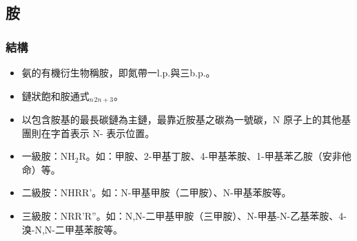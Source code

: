\documentclass[a4paper,12pt]{report}
\begin{document}
\begin{itemize}
\subsection{胺}
\subsubsection{結構}
\begin{itemize}
\item 氨的有機衍生物稱胺，即氮帶一l.p.與三b.p.。
\item 鏈狀飽和胺通式\rmC$_n$\rmH$_{2n+3}$\rmN。
\item 以包含胺基的最長碳鏈為主鏈，最靠近胺基之碳為一號碳，N 原子上的其他基團則在字首表示 N- 表示位置。
\item 一級胺：NH$_2$R。如：甲胺、2-甲基丁胺、4-甲基苯胺、1-甲基苯乙胺（安非他命）等。
\item 二級胺：NHRR'。如：N-甲基甲胺（二甲胺）、N-甲基苯胺等。
\item 三級胺：NRR'R''。如：N,N-二甲基甲胺（三甲胺）、N-甲基-N-乙基苯胺、4-溴-N,N-二甲基苯胺等。
\end{itemize}

\end{itemize}
\end{document}
